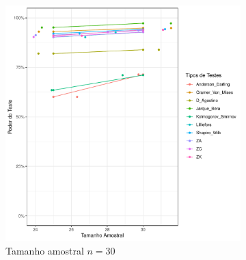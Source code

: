 \documentclass[a4paper,11pt]{article} %
\begin{document}
\begin{figure}[H]
    \centering
    \caption{Comparação do Poder do Teste dos testes AD, CM, DG, LL, JB, KS, ZA, ZC e ZK em função do tamanho amostral para a \textbf{Distribuição} \(\textbf{Cauchy}(0, 1)\).}
    \label{fig:poder_teste_dist_cauchy}
    
    \begin{subfigure}[b]{0.45\textwidth}
        \centering
        \includegraphics[width=\textwidth]{Distribuição Cauchy/Poder do Teste/poder_teste_cauchy_30.pdf}
        \caption{Tamanho amostral \(n = 30\)}
        \label{fig:cauchy_poder_30}
    \end{subfigure}
    \hfill
    \begin{subfigure}[b]{0.45\textwidth}
        \centering

\end{subfigure}
\end{figure}
\end{document}
